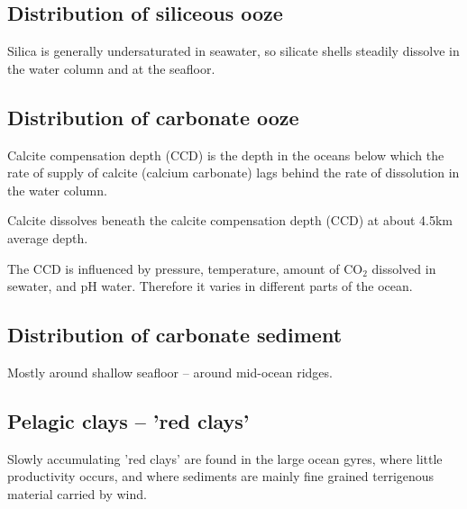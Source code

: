 \subsection{Distribution of siliceous ooze}

Silica is generally undersaturated in seawater, so silicate shells steadily
dissolve in the water column and at the seafloor.

\subsection{Distribution of carbonate ooze}

Calcite compensation depth (CCD) is the depth in the oceans below which the
rate of supply of calcite (calcium carbonate) lags behind the rate of
dissolution in the water column.

Calcite dissolves beneath the calcite compensation depth (CCD) at about 4.5km
average depth.

The CCD is influenced by pressure, temperature, amount of CO$_2$ dissolved in
sewater, and pH water. Therefore it varies in different parts of the ocean.

\subsection{Distribution of carbonate sediment}

Mostly around shallow seafloor -- around mid-ocean ridges.

\subsection{Pelagic clays -- 'red clays'}

Slowly accumulating 'red clays' are found in the large ocean gyres, where
little productivity occurs, and where sediments are mainly fine grained
terrigenous material carried by wind.

